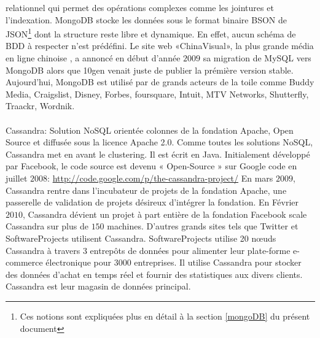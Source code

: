 relationnel qui permet des opérations complexes comme les jointures et
l'indexation. \textsf{MongoDB} stocke les données sous le format
binaire \textsf{BSON} de \textsf{JSON}\footnote{Ces notions sont
expliquées plus en détail à la section \ref{mongoDB} du présent
document} dont la structure reste libre et dynamique.  En effet, aucun
schéma de \textsf{BDD} à respecter n'est prédéfini\cite{mongoDB}. Le
site web «\textsf{ChinaVisual}», la plus grande média en ligne
chinoise
,
a annoncé en début d'année $2009$ sa migration de \textsf{MySQL}
vers \textsf{MongoDB}\cite{GUYunhua} alors que \textsf{10gen} venait juste de publier la prémière version stable. Aujourd'hui, \textsf{MongoDB} est utilisé par de grands acteurs de la toile comme \textsf{Buddy Media, Craigslist, Disney, Forbes, foursquare, Intuit, MTV Networks, Shutterfly, Traackr, Wordnik}\cite{10genClients}.
\\
\\ 
\textsf{Cassandra}:  Solution \textsf{NoSQL} orientée 
\textsf{colonnes} de la fondation \textsf{Apache}, Open Source et diffusée sous la licence
 Apache 2.0. Comme toutes les solutions \textsf{NoSQL}, \textsf{Cassandra} 
met en avant le clustering. Il est écrit en 
\textsf{Java}\cite{RickCattell}. Initialement développé par 
\textsf{Facebook}, le code source est devenu « \textsf{Open-Source} » sur 
\textsf{Google code} en juillet $2008$: 
\url{http://code.google.com/p/the-cassandra-project/}
En
mars $2009$, \textsf{Cassandra} rentre dans l'incubateur de projets
de la fondation \textsf{Apache}, une passerelle de
validation de projets désireux d'intégrer la fondation. En Février
$2010$, \textsf{Cassandra} dévient un projet à part entière de la
fondation
\textsf{Facebook}
scale \textsf{Cassandra} sur plus de $150$ machines. D'autres grands
sites tels que \textsf{Twitter et SoftwareProjects}
utilisent \textsf{Cassandra}. \textsf{SoftwareProjects} utilise 20
nœuds \textsf{Cassandra} à travers 3 entrepôts de données pour
alimenter leur plate-forme e-commerce électronique pour $3000$
entreprises. Il utilise \textsf{Cassandra} pour stocker des données
d'achat en temps réel et fournir des statistiques aux divers
clients. \textsf{Cassandra} est leur magasin de données
principal\cite{apacheClients}.
\\

